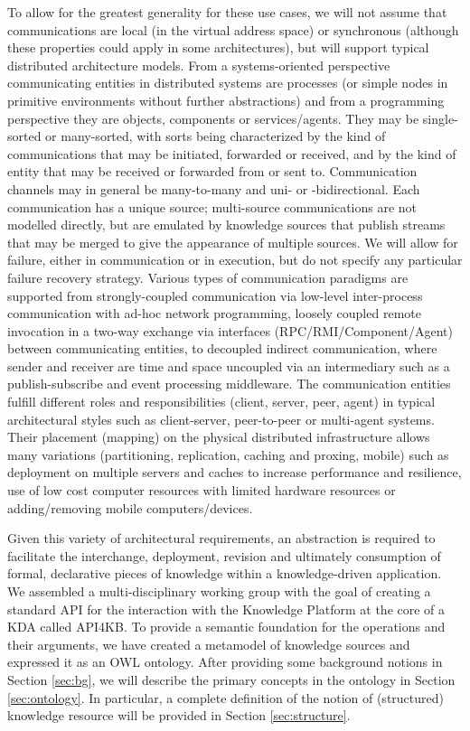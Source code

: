 \documentclass[runningheads]{llncs}
\begin{document}
To allow for the greatest generality for these use cases, we will not assume that communications are local (in the virtual address space) or synchronous (although these properties could apply in some architectures), but will support typical distributed architecture models.  
From a systems-oriented perspective communicating entities in distributed systems are processes (or simple nodes in primitive environments without further abstractions) and from a programming perspective they are objects, components or services/agents. They may be single-sorted or many-sorted, with sorts being characterized by the kind of communications that may be initiated, forwarded or received, and by the kind of entity that may be received or forwarded from or sent to.
Communication channels may in general be many-to-many and uni- or -bidirectional. Each communication has a unique source; multi-source communications are not modelled directly, but are emulated by knowledge sources that publish streams that may be merged to give the appearance of multiple sources. We will allow for failure, either in communication or in execution, but do not specify any particular failure recovery strategy. 
Various types of communication paradigms are supported from strongly-coupled communication via low-level inter-process communication with ad-hoc network programming, loosely coupled remote invocation in a two-way exchange via interfaces  (RPC/RMI/Component/Agent) between communicating entities, to decoupled indirect communication, where sender and receiver are time and space uncoupled via an intermediary such as a publish-subscribe and event processing middleware.
The communication entities fulfill different roles and responsibilities (client, server, peer, agent) in typical architectural styles such as client-server, peer-to-peer or multi-agent systems. Their placement (mapping) on the physical distributed infrastructure allows many variations (partitioning, replication, caching and proxing, mobile) such as deployment on multiple servers and caches to increase performance and resilience, use of low cost computer resources with limited hardware resources or adding/removing mobile computers/devices.

Given this variety of architectural requirements, an abstraction is required to facilitate the interchange, deployment, revision and ultimately consumption of formal, declarative pieces of knowledge within a knowledge-driven application. We assembled a multi-disciplinary working group with the goal of creating a standard API for the interaction with the Knowledge Platform at the core of a KDA called API4KB. %
To provide a semantic foundation for the operations and their arguments, we have created a metamodel of knowledge sources and expressed it as an OWL ontology.
After providing some background notions in Section \ref{sec:bg}, we will describe the primary concepts in the ontology in Section \ref{sec:ontology}. In particular, a complete definition of the notion of (structured) knowledge resource will be provided in Section \ref{sec:structure}. 
\end{document}
